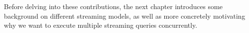Before delving into these contributions, the next chapter introduces some background on different streaming models, as well as more concretely motivating why we want to execute multiple streaming queries concurrently.



